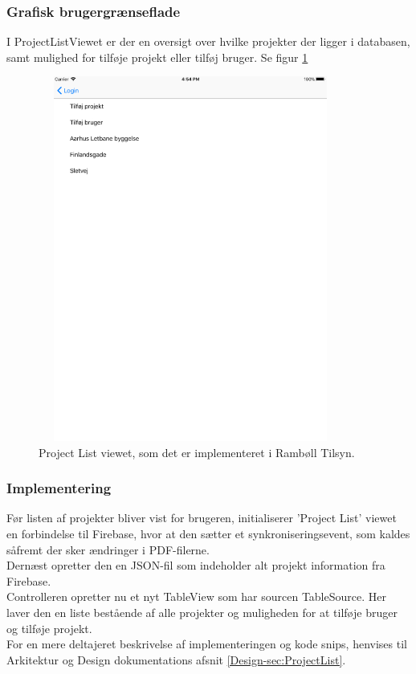 \subsubsection{Grafisk brugergrænseflade}
I ProjectListViewet er der en oversigt over hvilke projekter der ligger i databasen, samt mulighed for tilføje projekt eller tilføj bruger. Se figur \ref{fig:ProjectListView}
\begin{figure}[H] %
	\centering
	\includegraphics[height=12cm, width=10cm]{Design/Applikation/ProjektList/ProjectList}
	\caption{Project List viewet, som det er implementeret i Rambøll Tilsyn.}
	\label{fig:ProjectListView}
\end{figure}

\subsubsection{Implementering}
Før listen af projekter bliver vist for brugeren, initialiserer 'Project List' viewet en forbindelse til Firebase, hvor at den sætter et synkroniseringsevent, som kaldes såfremt der sker ændringer i PDF-filerne. \\
Dernæst opretter den en JSON-fil som indeholder alt projekt information fra Firebase. \\
Controlleren opretter nu et nyt TableView som har sourcen TableSource. Her laver den en liste bestående af alle projekter og muligheden for at tilføje bruger og tilføje projekt. \\
For en mere deltajeret beskrivelse af implementeringen og kode snips, henvises til Arkitektur og Design dokumentations afsnit \ref{Design-sec:ProjectList}.

\clearpage